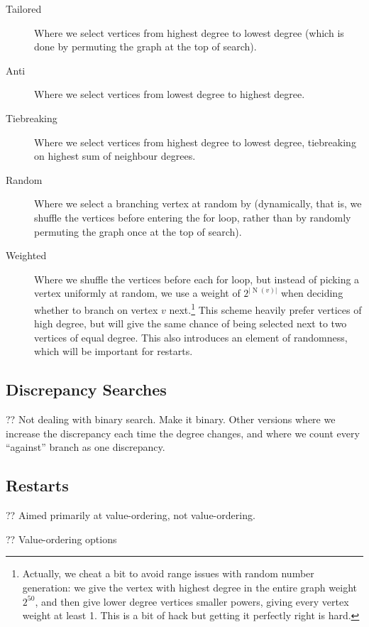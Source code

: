 \documentclass{article}
\newcommand{\neighbourhood}{\operatorname{N}}
\begin{document}
\begin{description}
    \item[Tailored] Where we select vertices from highest degree to lowest degree (which is done by
        permuting the graph at the top of search).
    \item[Anti] Where we select vertices from lowest degree to highest degree.
    \item[Tiebreaking] Where we select vertices from highest degree to lowest degree,
        tiebreaking on highest sum of neighbour degrees.
    \item[Random] Where we select a branching vertex at random by (dynamically, that is, we shuffle
        the vertices before entering the for loop, rather than by randomly permuting the graph once at the
        top of search).
    \item[Weighted] Where we shuffle the vertices before each for loop, but instead of
        picking a vertex uniformly at random, we use a weight of
        $2^{\left|\neighbourhood(v)\right|}$ when deciding whether to branch on vertex $v$
        next.\footnote{Actually, we cheat a bit to avoid range issues with random number generation:
        we give the vertex with highest degree in the entire graph weight $2^{50}$, and then give
        lower degree vertices smaller powers, giving every vertex weight at least 1. This is a bit
        of hack but getting it perfectly right is hard.} This scheme heavily prefer vertices of high
        degree, but will give the same chance of being selected next to two vertices of equal
        degree. This also introduces an element of randomness, which will be important for restarts.
\end{description}

\subsection{Discrepancy Searches}

?? Not dealing with binary search. Make it binary. Other versions where we increase the discrepancy
each time the degree changes, and where we count every ``against'' branch as one discrepancy.

\subsection{Restarts}

?? Aimed primarily at value-ordering, not value-ordering.

?? Value-ordering options
\end{document}
